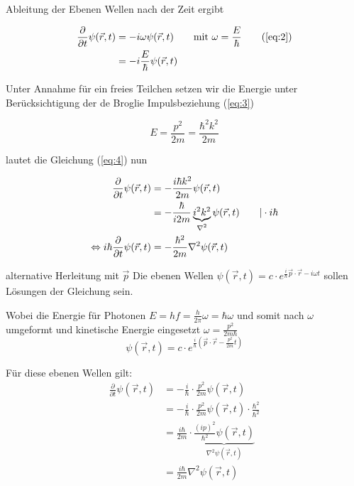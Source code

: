 Ableitung der Ebenen Wellen nach der Zeit ergibt

\begin{align}
  \label{eq:4}
   \frac{\partial}{\partial t}\psi(\vec{r},t) &= -i \omega \psi(\vec{r},t) \qquad \text{mit } \omega=\frac{E}{\hbar} \qquad (\ref{eq:2}) \\
&= -i \frac{E}{\hbar} \psi(\vec{r},t) 
\end{align}

Unter Annahme für ein freies Teilchen setzen wir die Energie unter Berücksichtigung der de Broglie Impulsbeziehung (\ref{eq:3})

\begin{equation}
  \label{eq:6}
  E=\frac{p^2}{2m}=\frac{\hbar^2k^2}{2m}
\end{equation}


lautet die Gleichung (\ref{eq:4}) nun

\begin{align}
  \label{eq:7}
  \frac{\partial}{\partial t}\psi(\vec{r},t) &=-\frac{i\hbar k^2}{2m}  \psi(\vec{r},t) \\
 &=-\frac{\hbar}{i2m} \underbr{i^2k^2}_{\nabla^2} \psi(\vec{r},t) \qquad |\cdot i\hbar\\
\Leftrightarrow i\hbar  \frac{\partial}{\partial t}\psi(\vec{r},t) &= -\frac{\hbar^2}{2m} \nabla^2\psi(\vec{r},t)
\end{align}




alternative Herleitung mit \(\vec p\)
Die ebenen Wellen \(\psi(\vec{r},t)=c\cdot  e^{\frac{i}{\hbar}\vec{p}\cdot\vec{r}-i\omega t}\) sollen  Lösungen der Gleichung sein. 

Wobei die Energie für Photonen \(E=hf=\frac{h}{2\pi}\omega=\hbar\omega\) und somit nach \(\omega\) umgeformt und kinetische Energie eingesetzt \(\omega = \frac{p^2}{2m\hbar}\)  \\

  \begin{equation}
    \label{eq:1}
    \psi(\vec{r},t)=c\cdot  e^{\frac{i}{\hbar}(\vec{p}\cdot\vec{r}-\frac{p^{2}}{2m}t)}
  \end{equation}

  Für diese ebenen Wellen gilt:
  \begin{align*}
    \frac{\partial}{\partial t}\psi(\vec{r},t) &=
      -\frac{i}{\hbar}\cdot\frac{p^{2}}{2m}\psi(\vec{r},t)\\
      &=-\frac{i}{\hbar}\cdot\frac{p^{2}}{2m}\psi(\vec{r},t)
      \cdot \frac{\hbar^2}{\hbar^2}\\
  &= \frac{i\hbar}{2m}\cdot  \underbrace{\frac{(ip)^2}{\hbar^2}\psi(\vec{r},t)}_{\nabla^2\psi(\vec{r},t)}\\
  &= \frac{i\hbar}{2m}\nabla^2\psi(\vec{r},t)
\end{align*}



